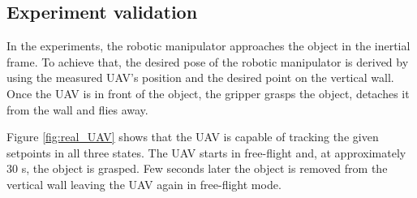 \documentclass[a4paper, 10pt, conference]{ieeeconf}
\begin{document}
\subsection{Experiment validation}
In the experiments, the robotic manipulator approaches
the object in the inertial frame. To achieve that, the
desired pose of the robotic manipulator is derived by using the
measured UAV's position and the desired point on the vertical
wall. Once the UAV is in front of the object, the gripper grasps the
object, detaches it from the wall and flies away.

Figure \ref{fig:real_UAV} shows that the UAV is capable of tracking the
given setpoints in all three states. The UAV starts in
free-flight and, at approximately $30$ s, the object is grasped. Few seconds later the object is removed from the vertical wall
leaving the UAV again in free-flight mode. %
\end{document}
